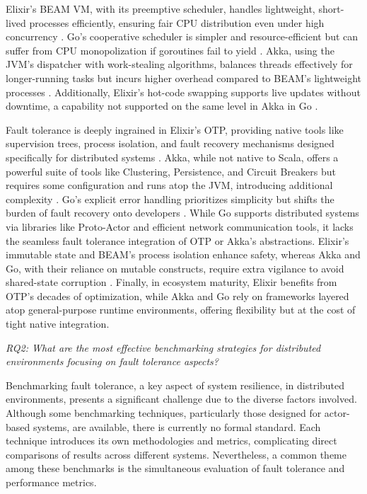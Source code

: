 Elixir’s BEAM VM, with its preemptive scheduler, handles lightweight, short-lived processes efficiently, ensuring fair CPU distribution even under high concurrency \cite{elixir-docs-hexdocs}. Go’s cooperative scheduler is simpler and resource-efficient but can suffer from CPU monopolization if goroutines fail to yield \cite{go-docs}. Akka, using the JVM’s dispatcher with work-stealing algorithms, balances threads effectively for longer-running tasks but incurs higher overhead compared to BEAM’s lightweight processes \cite{akka-docs}. Additionally, Elixir’s hot-code swapping supports live updates without downtime, a capability not supported on the same level in Akka in Go \cite{Juric2024}.

Fault tolerance is deeply ingrained in Elixir’s OTP, providing native tools like supervision trees, process isolation, and fault recovery mechanisms designed specifically for distributed systems \cite{elixir-docs-hexdocs}. Akka, while not native to Scala, offers a powerful suite of tools like Clustering, Persistence, and Circuit Breakers but requires some configuration and runs atop the JVM, introducing additional complexity \cite{akka-docs}. Go’s explicit error handling prioritizes simplicity but shifts the burden of fault recovery onto developers \cite{go-docs}. While Go supports distributed systems via libraries like Proto-Actor and efficient network communication tools, it lacks the seamless fault tolerance integration of OTP or Akka’s abstractions. Elixir’s immutable state and BEAM’s process isolation enhance safety, whereas Akka and Go, with their reliance on mutable constructs, require extra vigilance to avoid shared-state corruption \cite{go-docs,akka-docs}. Finally, in ecosystem maturity, Elixir benefits from OTP’s decades of optimization, while Akka and Go rely on frameworks layered atop general-purpose runtime environments, offering flexibility but at the cost of tight native integration.

\textit{RQ2: What are the most effective benchmarking strategies for distributed environments focusing on fault tolerance aspects?}

Benchmarking fault tolerance, a key aspect of system resilience, in distributed environments, presents a significant challenge due to the diverse factors involved. Although some benchmarking techniques, particularly those designed for actor-based systems, are available, there is currently no formal standard. Each technique introduces its own methodologies and metrics, complicating direct comparisons of results across different systems. Nevertheless, a common theme among these benchmarks is the simultaneous evaluation of fault tolerance and performance metrics.

